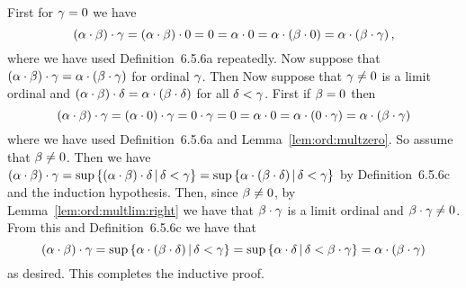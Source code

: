 {{    First for $\gamma=0$ we have
    $$
    (\alpha \cdot \beta) \cdot \gamma = (\alpha \cdot \beta) \cdot 0 = 0 = \alpha \cdot 0 = \alpha \cdot (\beta \cdot 0) = \alpha \cdot (\beta \cdot \gamma) \,,
    $$
    where we have used Definition~6.5.6a repeatedly.
    Now suppose that $(\alpha \cdot \beta) \cdot \gamma = \alpha \cdot (\beta \cdot \gamma)$ for ordinal $\gamma$.
    Then
    Now suppose that $\gamma \neq 0$ is a limit ordinal and $(\alpha \cdot \beta) \cdot \delta = \alpha \cdot (\beta \cdot \delta)$ for all $\delta < \gamma$.
    First if $\beta = 0$ then
    $$
    (\alpha \cdot \beta) \cdot \gamma = (\alpha \cdot 0) \cdot \gamma = 0 \cdot \gamma = 0 = \alpha \cdot 0 = \alpha \cdot (0 \cdot \gamma) = \alpha \cdot (\beta \cdot \gamma)
    $$
    where we have used Definition~6.5.6a and Lemma~\ref{lem:ord:multzero}.
    So assume that $\beta \neq 0$.
    Then we have $(\alpha \cdot \beta) \cdot \gamma = \sup\left\{ (\alpha \cdot \beta) \cdot \delta \,|\, \delta < \gamma \right\} = \sup\left\{ \alpha \cdot (\beta \cdot \delta) \,|\, \delta < \gamma \right\}$ by Definition~6.5.6c and the induction hypothesis.
    Then, since $\beta \neq 0$, by Lemma~\ref{lem:ord:multlim:right} we have that $\beta \cdot \gamma$ is a limit ordinal and $\beta \cdot \gamma \neq 0$.
    From this and Definition~6.5.6c we have that
    $$
    (\alpha \cdot \beta) \cdot \gamma = \sup\left\{ \alpha \cdot (\beta \cdot \delta) \,|\, \delta < \gamma \right\} = \sup\left\{ \alpha \cdot \delta \,|\, \delta < \beta \cdot \gamma \right\} = \alpha \cdot (\beta \cdot \gamma)
    $$
    as desired.
    This completes the  inductive proof.
  }
}

